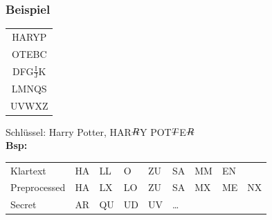 \documentclass[landscape,twocolumn,a4paper]{article}
\newcommand{\Bold}[1]{\textbf{#1}} %
\newcommand{\T}[1]{\text{#1}} %
\newcommand{\Nicht}[1]{\T{\sout{$ #1 $}}} %
\begin{document}
\subsubsection{Beispiel}
\begin{tabular}{|c|}\hline
 HARYP\\
 OTEBC\\
 DFG$\frac{\T{I}}{\T{J}}$K\\
 LMNQS\\
 UVWXZ\\\hline
\end{tabular}
Schlüssel: Harry Potter, HAR$\Nicht{R}$Y POT$\Nicht{T}$E$\Nicht{R}$\\
\Bold{Bsp:}
\begin{tabular}{lllllllll}
 Klartext&HA&LL&O&ZU&SA&MM&EN\\
 Preprocessed&HA&LX&LO&ZU&SA&MX&ME&NX\\
 Secret&AR&QU&UD&UV&\dots\\
\end{tabular}\\
\end{document}
